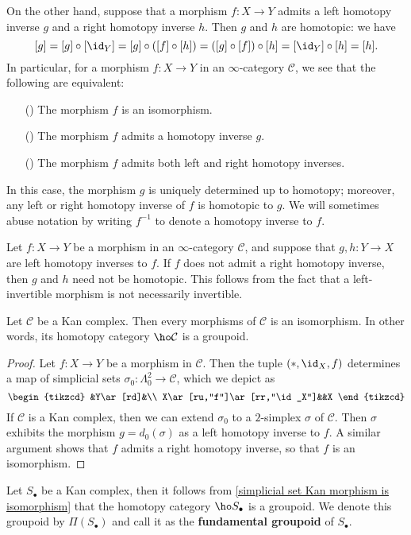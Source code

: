 On the other hand, suppose that a morphism $f:X\to Y$ admits a left homotopy inverse $g$ and a right homotopy inverse $h$. Then $g$ and $h$ are homotopic: we have
\[[g]=[g]\circ[\id_Y]=[g]\circ([f]\circ[h])=([g]\circ[f])\circ[h]=[\id_Y]\circ[h]=[h].\]
In particular, for a morphism $f:X\to Y$ in an $\infty$-category $\mathcal{C}$, we see that the following are equivalent:
\begin{itemize}
\item[(\rmnum{1})] The morphism $f$ is an isomorphism.
\item[(\rmnum{2})] The morphism $f$ admits a homotopy inverse $g$.
\item[(\rmnum{3})] The morphism $f$ admits both left and right homotopy inverses.
\end{itemize}
In this case, the morphism $g$ is uniquely determined up to homotopy; moreover, any left or right homotopy inverse of $f$ is homotopic to $g$. We will sometimes abuse notation by writing $f^{-1}$ to denote a homotopy inverse to $f$.
\begin{remark}
Let $f:X\to Y$ be a morphism in an $\infty$-category $\mathcal{C}$, and suppose that $g,h:Y\to X$ are left homotopy inverses to $f$. If $f$ does not admit a right homotopy inverse, then $g$ and $h$ need not be homotopic. This follows from the fact that a left-invertible morphism is not necessarily invertible.
\end{remark}
\begin{proposition}\label{simplicial set Kan morphism is isomorphism}
Let $\mathcal{C}$ be a Kan complex. Then every morphisms of $\mathcal{C}$ is an isomorphism. In other words, its homotopy category $\ho\mathcal{C}$ is a groupoid.
\end{proposition}
\begin{proof}
Let $f:X\to Y$ be a morphism in $\mathcal{C}$. Then the tuple $(\ast,\id_X,f)$ determines a map of simplicial sets $\sigma_0:\Lambda^2_0\to\mathcal{C}$, which we depict as
\[\begin{tikzcd}
&Y\ar[rd]&\\
X\ar[ru,"f"]\ar[rr,"\id_X"]&&X
\end{tikzcd}\]
If $\mathcal{C}$ is a Kan complex, then we can extend $\sigma_0$ to a $2$-simplex $\sigma$ of $\mathcal{C}$. Then $\sigma$ exhibits the morphism $g=d_0(\sigma)$ as a left homotopy inverse to $f$. A similar argument shows that $f$ admits a right homotopy inverse, so that $f$ is an isomorphism.
\end{proof}
Let $S_\bullet$ be a Kan complex, then it follows from \cref{simplicial set Kan morphism is isomorphism} that the homotopy category $\ho S_\bullet$ is a groupoid. We denote this groupoid by $\Pi(S_\bullet)$ and call it as the \textbf{fundamental groupoid} of $S_\bullet$.
